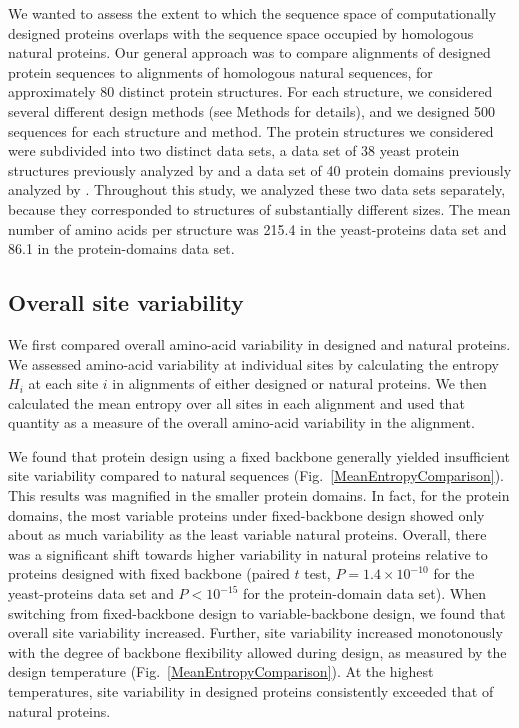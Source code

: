 \documentclass[12pt]{article}
\begin{document}
We wanted to assess the extent to which the sequence space of computationally designed proteins overlaps with the sequence space occupied by homologous natural proteins. Our general approach was to compare alignments of designed protein sequences to alignments of homologous natural sequences, for approximately 80 distinct protein structures. For each structure, we considered several different design methods (see Methods for details), and we designed 500 sequences for each structure and method. The protein structures we considered were subdivided into two distinct data sets, a data set of 38 yeast protein structures previously analyzed by \citet{Ramsey2011} and a data set of 40 protein domains previously analyzed by \citet{OllikainenKortemme}. Throughout this study, we analyzed these two data sets separately, because they corresponded to structures of substantially different sizes. The mean number of amino acids per structure was 215.4 in the yeast-proteins data set and 86.1 in the protein-domains data set.

\subsection{Overall site variability}
\label{SiteVariability}

We first compared overall amino-acid variability in designed and natural proteins. We assessed amino-acid variability at individual sites by calculating the entropy $H_i$ at each site $i$ in alignments of either designed or natural proteins. We then calculated the mean entropy over all sites in each alignment and used that quantity as a measure of the overall amino-acid variability in the alignment.

We found that protein design using a fixed backbone generally yielded insufficient site variability compared to natural sequences (Fig.~\ref{MeanEntropyComparison}).  This results was magnified in the smaller protein domains. In fact, for the protein domains, the most variable proteins under fixed-backbone design showed only about as much variability as the least variable natural proteins. Overall, there was a significant shift towards higher variability in natural proteins relative to proteins designed with fixed backbone (paired $t$ test, $P = 1.4\times10^{-10}$ for the yeast-proteins data set and $P<10^{-15}$ for the protein-domain data set). When switching from fixed-backbone design to variable-backbone design, we found that overall site variability increased. Further, site variability increased monotonously with the degree of backbone flexibility allowed during design, as measured by the design temperature (Fig.~\ref{MeanEntropyComparison}). At the highest temperatures, site variability in designed proteins consistently exceeded that of natural proteins. 
\end{document}
